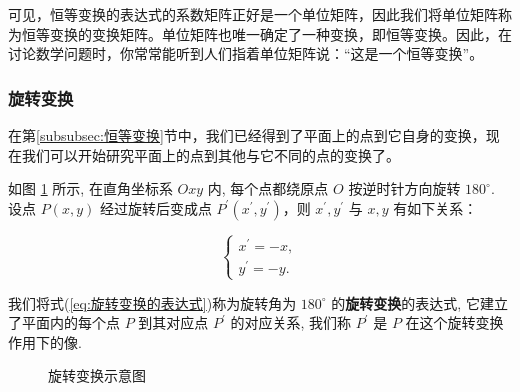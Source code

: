 可见，恒等变换的表达式的系数矩阵正好是一个单位矩阵，因此我们将单位矩阵称为恒等变换的\textcolor{third}{变换矩阵}。单位矩阵也唯一确定了一种变换，即恒等变换。因此，在讨论数学问题时，你常常能听到人们指着单位矩阵说：“这是一个恒等变换”。

\subsubsection{旋转变换}
\label{subsubsec:旋转变换}

在第\ref{subsubsec:恒等变换}节中，我们已经得到了平面上的点到它自身的变换，现在我们可以开始研究平面上的点到其他与它不同的点的变换了。

如图 \ref{fig:旋转变换} 所示, 在直角坐标系 $O x y$ 内, 每个点都绕原点 $O$ 按逆时针方向旋转 $180^{\circ}$. 设点 $P(x, y)$ 经过旋转后变成点 $P^{\prime}\left(x^{\prime}, y^{\prime}\right)$，则 $x^{\prime}, y^{\prime}$ 与 $x, y$ 有如下关系：

\begin{equation}
\left\{\begin{array}{l}
x^{\prime}=-x, \\
y^{\prime}=-y .
\end{array}\right.
\label{eq:旋转变换的表达式}
\end{equation}

我们将式(\ref{eq:旋转变换的表达式})称为旋转角为 $180^{\circ}$ 的\textcolor{third}{\bf 旋转变换}的表达式, 它建立了平面内的每个点 $P$ 到其对应点 $P^{\prime}$ 的对应关系, 我们称 $P^{\prime}$ 是 $P$ 在这个旋转变换作用下的像.

\begin{figure}[h]
\centering
{}
\caption{旋转变换示意图\label{fig:旋转变换}}
\end{figure}

